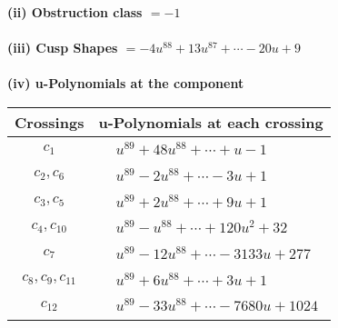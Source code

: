 \documentclass[1p]{elsarticle_modified}
\theoremstyle{definition}
\begin{document}
\flushleft \textbf{(ii) Obstruction class $= -1$}\\~\\
\flushleft \textbf{(iii) Cusp Shapes $= -4 u^{88}+13 u^{87}+\cdots-20 u+9$}\\~\\
\newpage\renewcommand{\arraystretch}{1}
\flushleft \textbf{(iv) u-Polynomials at the component}\newline \\
\begin{tabular}{m{50pt}|m{274pt}}
Crossings & \hspace{64pt}u-Polynomials at each crossing \\
\hline $$\begin{aligned}c_{1}\end{aligned}$$&$\begin{aligned}
&u^{89}+48 u^{88}+\cdots+u-1
\end{aligned}$\\
\hline $$\begin{aligned}c_{2},c_{6}\end{aligned}$$&$\begin{aligned}
&u^{89}-2 u^{88}+\cdots-3 u+1
\end{aligned}$\\
\hline $$\begin{aligned}c_{3},c_{5}\end{aligned}$$&$\begin{aligned}
&u^{89}+2 u^{88}+\cdots+9 u+1
\end{aligned}$\\
\hline $$\begin{aligned}c_{4},c_{10}\end{aligned}$$&$\begin{aligned}
&u^{89}- u^{88}+\cdots+120 u^2+32
\end{aligned}$\\
\hline $$\begin{aligned}c_{7}\end{aligned}$$&$\begin{aligned}
&u^{89}-12 u^{88}+\cdots-3133 u+277
\end{aligned}$\\
\hline $$\begin{aligned}c_{8},c_{9},c_{11}\end{aligned}$$&$\begin{aligned}
&u^{89}+6 u^{88}+\cdots+3 u+1
\end{aligned}$\\
\hline $$\begin{aligned}c_{12}\end{aligned}$$&$\begin{aligned}
&u^{89}-33 u^{88}+\cdots-7680 u+1024
\end{aligned}$\\
\hline
\end{tabular}\\~\\
\end{document}
